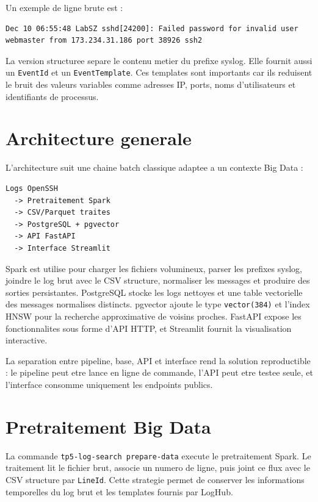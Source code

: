 \documentclass[12pt,a4paper]{article}
\begin{document}
Un exemple de ligne brute est :

\begin{lstlisting}
Dec 10 06:55:48 LabSZ sshd[24200]: Failed password for invalid user webmaster from 173.234.31.186 port 38926 ssh2
\end{lstlisting}

La version structuree separe le contenu metier du prefixe syslog. Elle fournit aussi un
\texttt{EventId} et un \texttt{EventTemplate}. Ces templates sont importants car ils reduisent le
bruit des valeurs variables comme adresses IP, ports, noms d'utilisateurs et identifiants de
processus.

\section{Architecture generale}

L'architecture suit une chaine batch classique adaptee a un contexte Big Data :

\begin{lstlisting}
Logs OpenSSH
  -> Pretraitement Spark
  -> CSV/Parquet traites
  -> PostgreSQL + pgvector
  -> API FastAPI
  -> Interface Streamlit
\end{lstlisting}

Spark est utilise pour charger les fichiers volumineux, parser les prefixes syslog, joindre le log
brut avec le CSV structure, normaliser les messages et produire des sorties persistantes. PostgreSQL
stocke les logs nettoyes et une table vectorielle des messages normalises distincts. pgvector ajoute
le type \texttt{vector(384)} et l'index HNSW pour la recherche approximative de voisins proches.
FastAPI expose les fonctionnalites sous forme d'API HTTP, et Streamlit fournit la visualisation
interactive.

La separation entre pipeline, base, API et interface rend la solution reproductible : le pipeline peut
etre lance en ligne de commande, l'API peut etre testee seule, et l'interface consomme uniquement les
endpoints publics.

\section{Pretraitement Big Data}

La commande \texttt{tp5-log-search prepare-data} execute le pretraitement Spark. Le traitement lit le
fichier brut, associe un numero de ligne, puis joint ce flux avec le CSV structure par
\texttt{LineId}. Cette strategie permet de conserver les informations temporelles du log brut et les
templates fournis par LogHub.
\end{document}
